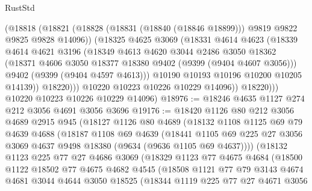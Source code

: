 \begin{lexlean}{RustStd}
\begin{coremodule}
                  (@18818
                    (@18821
                      (@18828 (@18831 (@18840 (@18846 @18899))) @9819 @9822 @9825 @9828 @14096))
                    (@18325
                      @4625
                      @3069
                      (@18331
                        @4614
                        @4623
                        (@18339
                          @4614
                          @4621
                          @3196
                          (@18349
                            @4613
                            @4620
                            @3044
                            @2486
                            @3050
                            @18362
                            (@18371 @4606 @3050 @18377 @18380 @9402 (@9399 (@9404 @4607 @3056)))
                            @9402
                            (@9399 (@9404 @4597 @4613)))
                          @10190
                          @10193
                          @10196
                          @10200
                          @10205
                          @14139))
                      @18220)))
                @10220
                @10223
                @10226
                @10229
                @14096))
            @18220)))
      @10220
      @10223
      @10226
      @10229
      @14096)
@18976 := @18246 @4635 @1127 @274 @212 @3056 @4691 @3056 @3696
@19176 := @18420
    @1126
    @80
    @212
    @3056
    @4689
    @2915
    @945
    (@18127
      @1126
      @80
      @4689
      (@18132
        @1108
        @1125
        @69
        @79
        @4639
        @4688
        (@18187
          @1108
          @69
          @4639
          (@18441
            @1105
            @69
            @225
            @27
            @3056
            @3069
            @4637
            @9498
            @18380
            (@9634 (@9636 @1105 @69 @4637))))
        (@18132
          @1123
          @225
          @77
          @27
          @4686
          @3069
          (@18329
            @1123
            @77
            @4675
            @4684
            (@18500
              @1122
              @18502
              @77
              @4675
              @4682
              @4545
              (@18508
                @1121
                @77
                @79
                @3143
                @4674
                @4681
                @3044
                @4644
                @3050
                @18525
                (@18344
                  @1119
                  @225
                  @77
                  @27
                  @4671
                  @3056

\end{coremodule}
\end{lexlean}
